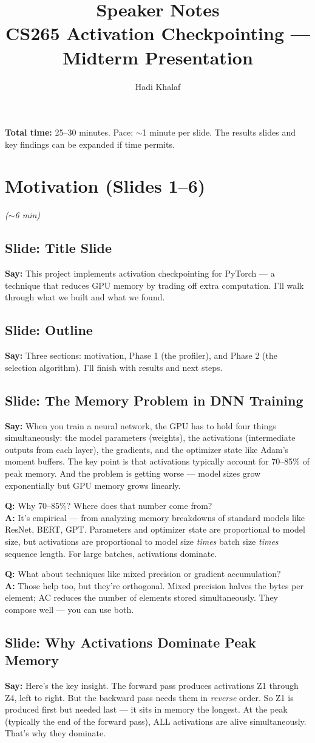 \documentclass[11pt]{article}
\title{Speaker Notes\\{\large CS265 Activation Checkpointing --- Midterm Presentation}}
\author{Hadi Khalaf}
\date{}
\newcommand{\slide}[1]{\subsection*{Slide: #1}}
\newcommand{\say}[1]{\textbf{Say:} #1}
\newcommand{\qa}[2]{\textcolor{question}{\textbf{Q:} #1} \\ \textbf{A:} #2}
\newcommand{\timing}[1]{\hfill\textcolor{note}{\textit{(#1)}}}
\begin{document}
\maketitle

\textbf{Total time:} 25--30 minutes. Pace: $\sim$1 minute per slide. The results slides and key findings can be expanded if time permits.

\tableofcontents

\section{Motivation (Slides 1--6)} \timing{$\sim$6 min}

\slide{Title Slide}
\say{This project implements activation checkpointing for PyTorch --- a technique that reduces GPU memory by trading off extra computation. I'll walk through what we built and what we found.}

\slide{Outline}
\say{Three sections: motivation, Phase 1 (the profiler), and Phase 2 (the selection algorithm). I'll finish with results and next steps.}

\slide{The Memory Problem in DNN Training}
\say{When you train a neural network, the GPU has to hold four things simultaneously: the model parameters (weights), the activations (intermediate outputs from each layer), the gradients, and the optimizer state like Adam's moment buffers. The key point is that activations typically account for 70--85\% of peak memory. And the problem is getting worse --- model sizes grow exponentially but GPU memory grows linearly.}

\qa{Why 70--85\%? Where does that number come from?}{It's empirical --- from analyzing memory breakdowns of standard models like ResNet, BERT, GPT. Parameters and optimizer state are proportional to model size, but activations are proportional to model size \emph{times} batch size \emph{times} sequence length. For large batches, activations dominate.}

\qa{What about techniques like mixed precision or gradient accumulation?}{Those help too, but they're orthogonal. Mixed precision halves the bytes per element; AC reduces the number of elements stored simultaneously. They compose well --- you can use both.}

\slide{Why Activations Dominate Peak Memory}
\say{Here's the key insight. The forward pass produces activations Z1 through Z4, left to right. But the backward pass needs them in \emph{reverse} order. So Z1 is produced first but needed last --- it sits in memory the longest. At the peak (typically the end of the forward pass), ALL activations are alive simultaneously. That's why they dominate.}
\end{document}
